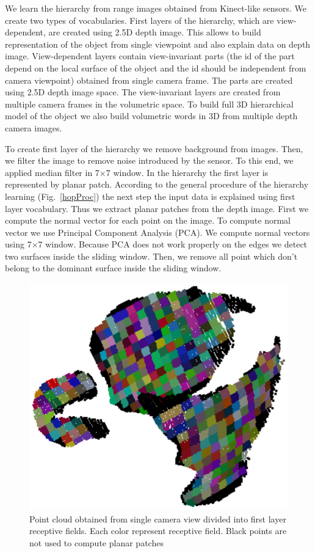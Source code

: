 \documentclass[letterpaper,10pt,conference]{ieeeconf}  %
\begin{document}
We learn the hierarchy from range images obtained from Kinect-like sensors. We create two types of vocabularies. First layers of the hierarchy, which are view-dependent, are created using 2.5D depth image. This allows to build representation of the object from single viewpoint and also explain data on depth image. View-dependent layers contain view-invariant parts (the id of the part depend on the local surface of the object and the id should be independent from camera viewpoint) obtained from single camera frame. The parts are created using 2.5D depth image space. The view-invariant layers are created from multiple camera frames in the volumetric space. To build full 3D hierarchical model of the object we also build volumetric words in 3D from multiple depth camera images. 

To create first layer of the hierarchy we remove background from images. Then, we filter the image to remove noise introduced by the sensor. To this end, we applied median filter in 7$\times$7 window. In the hierarchy the first layer is represented by planar patch. According to the general procedure of the hierarchy learning (Fig.~\ref{hopProc}) the next step the input data is explained using first layer vocabulary. Thus we extract planar patches from the depth image. First we compute the normal vector for each point on the image. To compute normal vector we use Principal Component Analysis (PCA). We compute normal vectors using 7$\times$7 window. Because PCA does not work properly on the edges we detect two surfaces inside the sliding window. Then, we remove all point which don't belong to the dominant surface inside the sliding window.

\begin{figure}[t]
 \centering
\includegraphics[width=0.5\columnwidth]{../images/recFields1.eps}
\caption{Point cloud obtained from single camera view divided into first layer receptive fields. Each color represent receptive field. Black points are not used to compute planar patches}
 \label{recFields1}
\end{figure}
\end{document}
